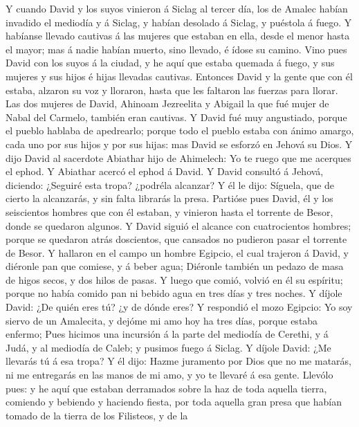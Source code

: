  Y cuando David y los suyos vinieron á Siclag al tercer
día, los de Amalec habían invadido el mediodía y á Siclag, y habían
desolado á Siclag, y puéstola á fuego.  Y habíanse llevado
cautivas á las mujeres que estaban en ella, desde el menor hasta el
mayor; mas á nadie habían muerto, sino llevado, é ídose su camino.
 Vino pues David con los suyos á la ciudad, y he aquí que
estaba quemada á fuego, y sus mujeres y sus hijos é hijas llevadas
cautivas.  Entonces David y la gente que con él estaba,
alzaron su voz y lloraron, hasta que les faltaron las fuerzas para
llorar.  Las dos mujeres de David, Ahinoam Jezreelita y
Abigail la que fué mujer de Nabal del Carmelo, también eran cautivas.
 Y David fué muy angustiado, porque el pueblo hablaba de
apedrearlo; porque todo el pueblo estaba con ánimo amargo, cada uno por
sus hijos y por sus hijas: mas David se esforzó en Jehová su Dios.
 Y dijo David al sacerdote Abiathar hijo de Ahimelech: Yo
te ruego que me acerques el ephod. Y Abiathar acercó el ephod á David.
 Y David consultó á Jehová, diciendo: ¿Seguiré esta tropa?
¿podréla alcanzar? Y él le dijo: Síguela, que de cierto la alcanzarás, y
sin falta librarás la presa.  Partióse pues David, él y
los seiscientos hombres que con él estaban, y vinieron hasta el torrente
de Besor, donde se quedaron algunos.  Y David siguió el
alcance con cuatrocientos hombres; porque se quedaron atrás doscientos,
que cansados no pudieron pasar el torrente de Besor.  Y
hallaron en el campo un hombre Egipcio, el cual trajeron á David, y
diéronle pan que comiese, y á beber agua;  Diéronle
también un pedazo de masa de higos secos, y dos hilos de pasas. Y luego
que comió, volvió en él su espíritu; porque no había comido pan ni
bebido agua en tres días y tres noches.  Y díjole David:
¿De quién eres tú? ¿y de dónde eres? Y respondió el mozo Egipcio: Yo soy
siervo de un Amalecita, y dejóme mi amo hoy ha tres días, porque estaba
enfermo;  Pues hicimos una incursión á la parte del
mediodía de Cerethi, y á Judá, y al mediodía de Caleb; y pusimos fuego á
Siclag.  Y díjole David: ¿Me llevarás tú á esa tropa? Y
él dijo: Hazme juramento por Dios que no me matarás, ni me entregarás en
las manos de mi amo, y yo te llevaré á esa gente. 
Llevólo pues: y he aquí que estaban derramados sobre la haz de toda
aquella tierra, comiendo y bebiendo y haciendo fiesta, por toda aquella
gran presa que habían tomado de la tierra de los Filisteos, y de la
